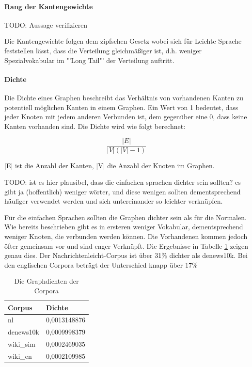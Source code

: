 \documentclass[12pt, a4paper]{article}
\begin{document}
\paragraph{Rang der Kantengewichte}

TODO: Aussage verifizieren

Die Kantengewichte folgen dem zipfschen Gesetz wobei sich f\"ur Leichte Sprache
feststellen l\"asst, dass die Verteilung gleichm\"a\ss{}iger ist, d.h. weniger
Spezialvokabular im "'Long Tail"' der Verteilung auftritt.

\paragraph{Dichte}

Die Dichte eines Graphen beschreibt das Verhältnis von vorhandenen Kanten zu
potentiell möglichen Kanten in einem Graphen. Ein Wert von 1 bedeutet, dass
jeder Knoten mit jedem anderen Verbunden ist, dem gegenüber eine 0, dass keine
Kanten vorhanden sind. Die Dichte wird wie folgt berechnet:

$$
    \frac{|E|}{|V|(|V|-1)}
$$

|E| ist die Anzahl der Kanten, |V| die Anzahl der Knoten im Graphen. 

TODO: ist es hier plausibel, dass die einfachen sprachen dichter sein sollten?
es gibt ja (hoffentlich) weniger wörter, und diese wenigen sollten
dementsprechend häufiger verwendet werden und sich untereinander so leichter
verknüpfen.

Für die einfachen Sprachen sollten die Graphen dichter sein als für die Normalen. 
Wie bereits beschrieben gibt es in ersteren weniger Vokabular, dementsprechend
weniger Knoten, die verbunden werden können. Die Vorhandenen kommen jedoch öfter 
gemeinsam vor und sind enger Verknüpft. Die Ergebnisse in Tabelle \ref{density_table}
zeigen genau dies. Der Nachrichtenleicht-Corpus ist über 31\% dichter als denews10k.
Bei den englischen Corpora beträgt der Unterschied knapp über 17\%


\begin{table}[h]
  \centering
  \begin{tabular}{l|l}
    Corpus            & Dichte          \\
    \hline
    nl                &  		0,0013148876 \\
    denews10k         &  		0,0009998379 \\
    wiki\_sim         &  		0,0002469035 \\
    wiki\_en          &  		0,0002109985 \\
  \end{tabular}
  \caption{\label{density_table} Die Graphdichten der Corpora}
\end{table}
\end{document}
